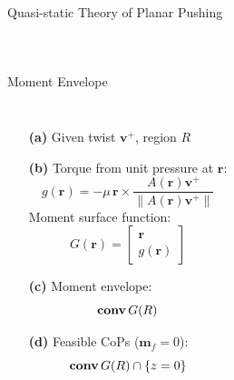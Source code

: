 \documentclass[10pt]{beamer}
\newcommand{\conv}{\mathop{\bf conv}}
\begin{document}
\begin{frame}{Quasi-static Theory of Planar Pushing}
\begin{columns}[c,onlytextwidth]
\begin{figure}
\begin{tikzpicture}[
        scale=1.25, every node/.style={scale=1.25},
        force/.style={>=latex,draw=black,fill=black},
        axis/.style={densely dashed,draw=gray,font=\small},
        ]
      \end{tikzpicture}
    \end{figure}

  \end{columns}
\end{frame}

\begin{frame}{Moment Envelope}
  \begin{columns}[c,onlytextwidth]
    \begin{itemize}%
      \item[\textbf{(a)}] Given twist $\mathbf{v}^+$, region $R$
      \item[\textbf{(b)}] Torque from unit pressure at $\mathbf{r}$:
      \begin{equation*}
        g(\mathbf{r}) = -\mu\,\mathbf{r}\times \frac{A(\mathbf{r})\mathbf{v}^+}{\lVert A(\mathbf{r})\mathbf{v}^+ \rVert}
      \end{equation*}
      Moment surface function:
      \begin{equation*}
        G(\mathbf{r}) =
        \begin{bmatrix*}
          \mathbf{r}\\
          g(\mathbf{r})
        \end{bmatrix*}
      \end{equation*}
    \item[\textbf{(c)}] Moment envelope:
      \begin{equation*}
        \conv G(R)
      \end{equation*}
    \item[\textbf{(d)}] Feasible CoPs ($\mathbf{m}_f=0$):
      \begin{equation*}\conv G(R) \cap \{z=0\}\end{equation*}
    \end{itemize}


\end{columns}
\end{frame}
\end{document}
